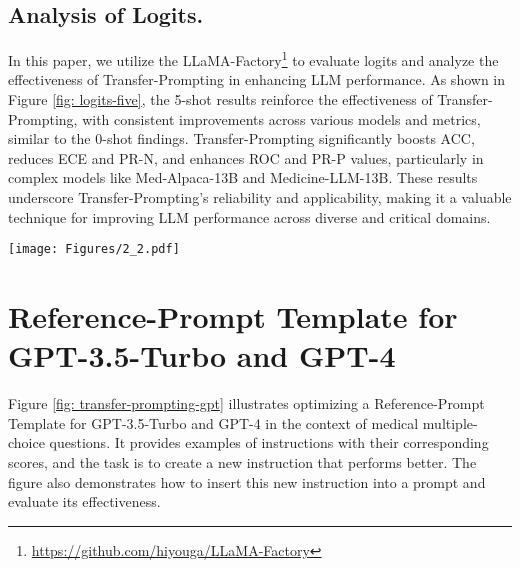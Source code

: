 \subsection{Analysis of Logits.}
In this paper, we utilize the LLaMA-Factory\footnote{\url{https://github.com/hiyouga/LLaMA-Factory}} to evaluate logits and analyze the effectiveness of Transfer-Prompting in enhancing LLM performance.
As shown in Figure \ref{fig: logits-five}, the 5-shot results reinforce the effectiveness of Transfer-Prompting, with consistent improvements across various models and metrics, similar to the 0-shot findings. Transfer-Prompting significantly boosts ACC, reduces ECE and PR-N, and enhances ROC and PR-P values, particularly in complex models like Med-Alpaca-13B and Medicine-LLM-13B. These results underscore Transfer-Prompting's reliability and applicability, making it a valuable technique for improving LLM performance across diverse and critical domains.


\begin{figure*}[!t]
\centering
\texttt{[image: Figures/2\_2.pdf]}
\hfill
\caption{An example of the reference prompt for reference LLM (GPT-3.5-Turbo and GPT-4) on the medically relevant datasets. The generated instruction is inserted at the position marked by <INS> in the input. The \textcolor{lightblackgreen}{green} text displays instructions for prompts and scores; the \textcolor{lightblackorange}{orange} text provides examples of how to apply the instruction; the \textcolor{lightblackblue}{blue} text contains the prompts and scores pairs.
}
\label{fig: transfer-prompting-gpt}
\end{figure*}

% 
\section{Reference-Prompt Template for GPT-3.5-Turbo and GPT-4}
\label{sec: reference-prompt-gpt4}
Figure \ref{fig: transfer-prompting-gpt} illustrates optimizing a  Reference-Prompt Template for GPT-3.5-Turbo and GPT-4  in the context of medical multiple-choice questions. It provides examples of instructions with their corresponding scores, and the task is to create a new instruction that performs better. The figure also demonstrates how to insert this new instruction into a prompt and evaluate its effectiveness.


